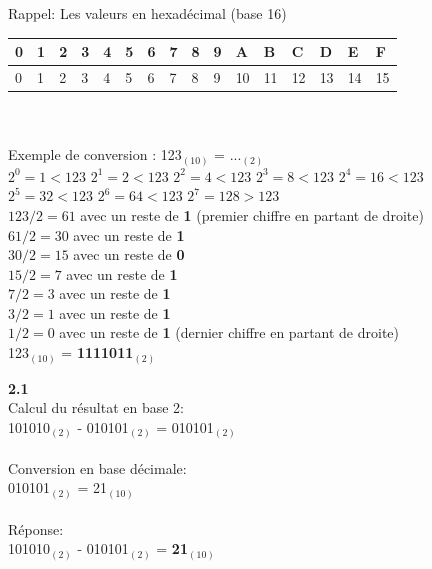 \begin{Exercice}[20 minutes]
\begin{conseil}
            Rappel: Les valeurs en hexadécimal (base 16)\\
            \begin{tabular}{| C{0.030\textwidth} | C{0.030\textwidth} | C{0.030\textwidth} | C{0.030\textwidth} | C{0.030\textwidth} | C{0.030\textwidth} | C{0.030\textwidth} | C{0.030\textwidth} | C{0.030\textwidth} | C{0.030\textwidth} | C{0.030\textwidth} | C{0.030\textwidth} | C{0.030\textwidth} | C{0.030\textwidth} | C{0.030\textwidth} | C{0.030\textwidth} |} 
            \hline
            \textbf{0} & \textbf{1} & \textbf{2} & \textbf{3} & \textbf{4} & \textbf{5} & \textbf{6} & \textbf{7} & \textbf{8} & \textbf{9} & \textbf{A} & \textbf{B} & \textbf{C} & \textbf{D} & \textbf{E} & \textbf{F}\\ [0.5ex]
             & 1 & 2 & 3 & 4 & 5 & 6 & 7 & 8 & 9 & 10 & 11 & 12 & 13 & 14 & 15 \\ [0.5ex] 
            \hline
        \end{tabular}\\\\
          Exemple de conversion : 123$_{(10)}$ = ...$_{(2)}$\\
        $2^0 = 1 < 123$\qquad
        $2^1 = 2 < 123$\qquad
        $2^2 = 4 < 123$\qquad
        $2^3 = 8 < 123$\qquad
        $2^4 = 16 < 123$\qquad
        $2^5 = 32 < 123$\qquad
        $2^6 = 64 < 123$\qquad
        $2^7 = 128 > 123$\\
        
        $123 / 2 = 61$ avec un reste de \textbf{1} (premier chiffre en partant de droite)\\
        $61 / 2 = 30$ avec un reste de \textbf{1}\\
        $30 / 2 = 15$ avec un reste de \textbf{0}\\
        $15 / 2 = 7$ avec un reste de \textbf{1}\\
        $7 / 2 = 3$ avec un reste de \textbf{1}\\
        $3 / 2 = 1$ avec un reste de \textbf{1}\\
        $1 / 2 = 0$ avec un reste de \textbf{1} (dernier chiffre en partant de droite)\\
        123$_{(10)}$ = \textbf{1111011$_{(2)}$}
    \end{conseil}
    \begin{solution} \textbf{2.1}\\
        Calcul du résultat en base 2:\\
        101010$_{(2)}$ - 010101$_{(2)}$ = 010101$_{(2)}$\\\\
        Conversion en base décimale:\\
        010101$_{(2)}$ = 21$_{(10)}$\\\\
        Réponse:\\
        101010$_{(2)}$ - 010101$_{(2)}$ = \textbf{21$_{(10)}$}\\\\
    

\end{solution}
\end{Exercice}
